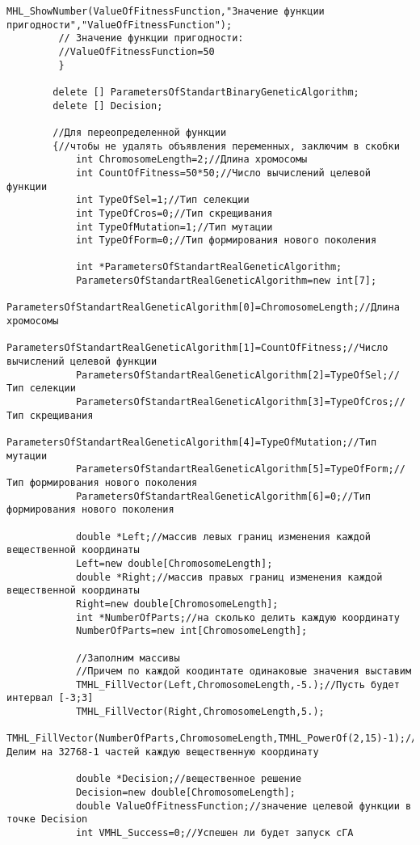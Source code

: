 \documentclass[a4paper,12pt]{article}
\begin{document}
\begin{lstlisting}[label=code_use_MHL_StandartGeneticAlgorithm,caption=Пример использования]
         MHL_ShowNumber(ValueOfFitnessFunction,"Значение функции пригодности","ValueOfFitnessFunction");
         // Значение функции пригодности:
         //ValueOfFitnessFunction=50
         }

        delete [] ParametersOfStandartBinaryGeneticAlgorithm;
        delete [] Decision;

        //Для переопределенной функции
        {//чтобы не удалять объявления переменных, заключим в скобки
            int ChromosomeLength=2;//Длина хромосомы
            int CountOfFitness=50*50;//Число вычислений целевой функции
            int TypeOfSel=1;//Тип селекции
            int TypeOfCros=0;//Тип скрещивания
            int TypeOfMutation=1;//Тип мутации
            int TypeOfForm=0;//Тип формирования нового поколения

            int *ParametersOfStandartRealGeneticAlgorithm;
            ParametersOfStandartRealGeneticAlgorithm=new int[7];
            ParametersOfStandartRealGeneticAlgorithm[0]=ChromosomeLength;//Длина хромосомы
            ParametersOfStandartRealGeneticAlgorithm[1]=CountOfFitness;//Число вычислений целевой функции
            ParametersOfStandartRealGeneticAlgorithm[2]=TypeOfSel;//Тип селекции
            ParametersOfStandartRealGeneticAlgorithm[3]=TypeOfCros;//Тип скрещивания
            ParametersOfStandartRealGeneticAlgorithm[4]=TypeOfMutation;//Тип мутации
            ParametersOfStandartRealGeneticAlgorithm[5]=TypeOfForm;//Тип формирования нового поколения
            ParametersOfStandartRealGeneticAlgorithm[6]=0;//Тип формирования нового поколения

            double *Left;//массив левых границ изменения каждой вещественной координаты
            Left=new double[ChromosomeLength];
            double *Right;//массив правых границ изменения каждой вещественной координаты
            Right=new double[ChromosomeLength];
            int *NumberOfParts;//на сколько делить каждую координату
            NumberOfParts=new int[ChromosomeLength];

            //Заполним массивы
            //Причем по каждой коодинтате одинаковые значения выставим
            TMHL_FillVector(Left,ChromosomeLength,-5.);//Пусть будет интервал [-3;3]
            TMHL_FillVector(Right,ChromosomeLength,5.);
            TMHL_FillVector(NumberOfParts,ChromosomeLength,TMHL_PowerOf(2,15)-1);//Делим на 32768-1 частей каждую вещественную координату

            double *Decision;//вещественное решение
            Decision=new double[ChromosomeLength];
            double ValueOfFitnessFunction;//значение целевой функции в точке Decision
            int VMHL_Success=0;//Успешен ли будет запуск cГА


\end{lstlisting}
\end{document}
